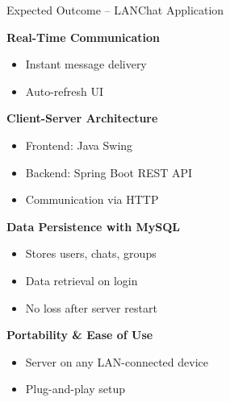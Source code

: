 \documentclass[aspectratio=1610]{beamer}
\begin{document}
\begin{frame}{Expected Outcome – LANChat Application}

\small
\textbf{Real-Time Communication}
\begin{itemize}
    \item Instant message delivery
    \item Auto-refresh UI
\end{itemize}

\vspace{0.2cm}
\textbf{Client-Server Architecture}
\begin{itemize}
    \item Frontend: Java Swing
    \item Backend: Spring Boot REST API
    \item Communication via HTTP 
\end{itemize}

\vspace{0.2cm}
\textbf{Data Persistence with MySQL}
\begin{itemize}
    \item Stores users, chats, groups
    \item Data retrieval on login
    \item No loss after server restart
\end{itemize}

\vspace{0.2cm}
\textbf{Portability \& Ease of Use}
\begin{itemize}
    \item Server on any LAN-connected device
    \item Plug-and-play setup
\end{itemize}

\end{frame}
\end{document}
